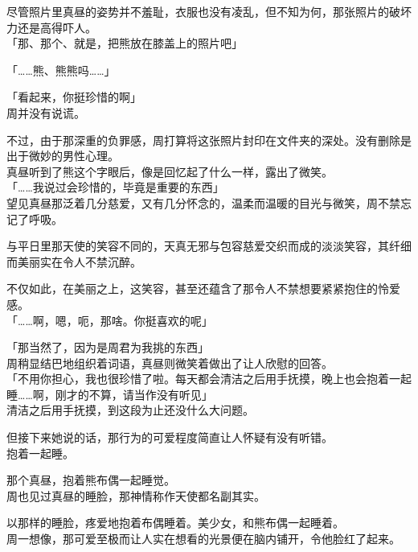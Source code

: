 尽管照片里真昼的姿势并不羞耻，衣服也没有凌乱，但不知为何，那张照片的破坏力还是高得吓人。\\

「那、那个、就是，把熊放在膝盖上的照片吧」

「……熊、熊熊吗……」

「看起来，你挺珍惜的啊」\\

周并没有说谎。

不过，由于那深重的负罪感，周打算将这张照片封印在文件夹的深处。没有删除是出于微妙的男性心理。\\

真昼听到了熊这个字眼后，像是回忆起了什么一样，露出了微笑。\\

「……我说过会珍惜的，毕竟是重要的东西」\\

望见真昼那泛着几分慈爱，又有几分怀念的，温柔而温暖的目光与微笑，周不禁忘记了呼吸。

与平日里那天使的笑容不同的，天真无邪与包容慈爱交织而成的淡淡笑容，其纤细而美丽实在令人不禁沉醉。

不仅如此，在美丽之上，这笑容，甚至还蕴含了那令人不禁想要紧紧抱住的怜爱感。\\

「……啊，嗯，呃，那啥。你挺喜欢的呢」

「那当然了，因为是周君为我挑的东西」\\

周稍显结巴地组织着词语，真昼则微笑着做出了让人欣慰的回答。\\

「不用你担心，我也很珍惜了啦。每天都会清洁之后用手抚摸，晚上也会抱着一起睡……啊，刚才的不算，请当作没有听见」\\

清洁之后用手抚摸，到这段为止还没什么大问题。

但接下来她说的话，那行为的可爱程度简直让人怀疑有没有听错。\\

抱着一起睡。

那个真昼，抱着熊布偶一起睡觉。\\

周也见过真昼的睡脸，那神情称作天使都名副其实。

以那样的睡脸，疼爱地抱着布偶睡着。美少女，和熊布偶一起睡着。\\

周一想像，那可爱至极而让人实在想看的光景便在脑内铺开，令他脸红了起来。\\

